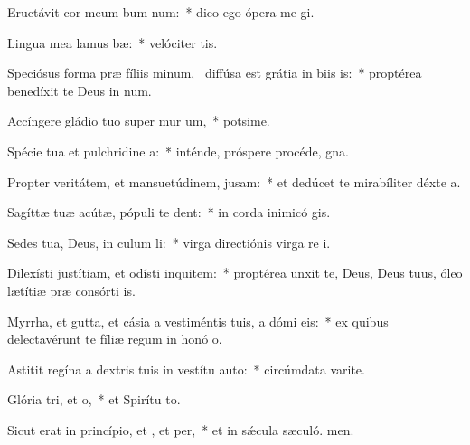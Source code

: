 \item Eructávit cor meum bum num:~* dico ego ópera me gi.
\item Lingua mea lamus bæ:~* velóciter tis.
\item Speciósus forma præ fíliis minum,~\pscross{} diffúsa est grátia in biis is:~* proptérea benedíxit te Deus in num.
\item Accíngere gládio tuo super mur um,~* potsime.
\item Spécie tua et pulchridine a:~* inténde, próspere procéde,  gna.
\item Propter veritátem, et mansuetúdinem,  jusam:~* et dedúcet te mirabíliter déxte a.
\item Sagíttæ tuæ acútæ, pópuli  te dent:~* in corda inimicó gis.
\item Sedes tua, Deus, in culum li:~* virga directiónis virga re i.
\item Dilexísti justítiam, et odísti inquitem:~* proptérea unxit te, Deus, Deus tuus, óleo lætítiæ præ consórti is.
\item Myrrha, et gutta, et cásia a vestiméntis tuis, a dómi eis:~* ex quibus delectavérunt te fíliæ regum in honó o.
\item Astitit regína a dextris tuis in vestítu auto:~* circúmdata varite.
\item Glória tri, et o,~* et Spirítu to.
\item Sicut erat in princípio, et , et per,~* et in sǽcula sæculó. men.
